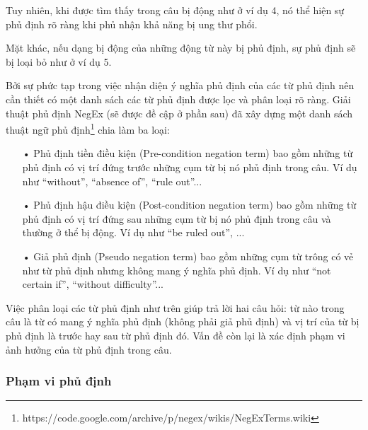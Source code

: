 
Tuy nhiên, khi được tìm thấy trong câu bị động như ở ví dụ 4, nó thể hiện sự phủ định rõ ràng khi phủ nhận khả năng bị ung thư phổi. 


Mặt khác, nếu dạng bị động của những động từ này bị phủ định, sự phủ định sẽ bị loại bỏ như ở ví dụ 5.


Bởi sự phức tạp trong việc nhận diện ý nghĩa phủ định của các từ phủ định nên cần thiết có một danh sách các từ phủ định được lọc và phân loại rõ ràng. Giải thuật phủ định NegEx \cite{Tanushi2013} (sẽ được đề cập ở phần sau) đã xây dựng một danh sách thuật ngữ phủ định\footnote{https://code.google.com/archive/p/negex/wikis/NegExTerms.wiki} chia làm ba loại:

\begin{itemize}[noitemsep]
\item[•] Phủ định tiền điều kiện (Pre-condition negation term) bao gồm những từ phủ định có vị trí đứng trước những cụm từ bị nó phủ định trong câu. Ví dụ như ``without'', ``absence of'', ``rule out''...
\item[•] Phủ định hậu điều kiện (Post-condition negation term) bao gồm những từ phủ định có vị trí đứng sau những cụm từ bị nó phủ định trong câu và thường ở thể bị động. Ví dụ như ``be ruled out'', ...
\item[•] Giả phủ định (Pseudo negation term) bao gồm những cụm từ trông có vẻ như từ phủ định nhưng không mang ý nghĩa phủ định. Ví dụ như ``not certain if'', ``without difficulty''...
\end{itemize}

Việc phân loại các từ phủ định như trên giúp trả lời hai câu hỏi: từ nào trong câu là từ có mang ý nghĩa phủ định (không phải giả phủ định) và vị trí của từ bị phủ định là trước hay sau từ phủ định đó. Vấn đề còn lại là xác định phạm vi ảnh hưởng của từ phủ định trong câu.

\subsubsection*{Phạm vi phủ định}

